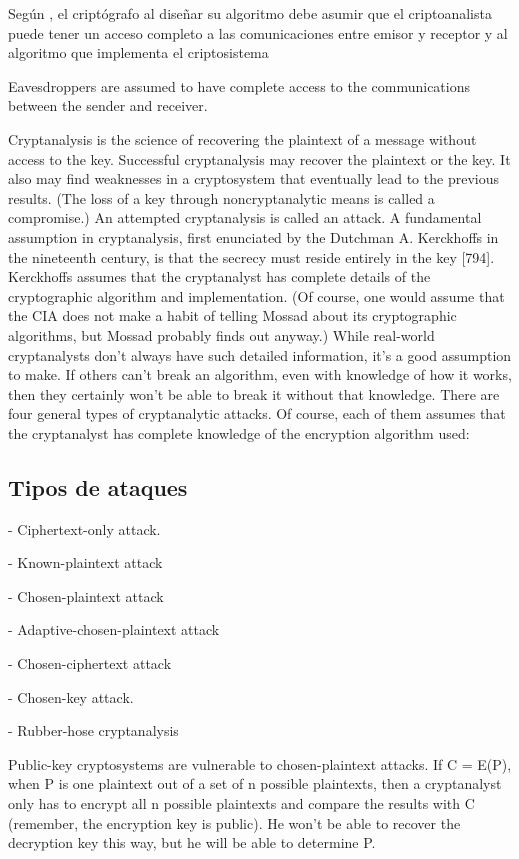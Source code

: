 Según \cite{bruce}, el criptógrafo al diseñar su algoritmo debe asumir que el criptoanalista puede tener un acceso completo a las comunicaciones entre emisor y receptor y al algoritmo que implementa el criptosistema

Eavesdroppers are assumed to have complete access to the communications between the sender and receiver.

Cryptanalysis is the science of recovering the plaintext of a message without access to the key. Successful cryptanalysis may recover the plaintext or the key. It also may find weaknesses in a cryptosystem that eventually lead to the previous results. (The loss of a key through noncryptanalytic means is called a compromise.) An attempted cryptanalysis is called an attack. A fundamental assumption in cryptanalysis, first enunciated by the Dutchman A. Kerckhoffs in the nineteenth century, is that the secrecy must reside entirely in the key [794]. Kerckhoffs assumes that the cryptanalyst has complete details of the cryptographic algorithm and implementation. (Of course, one would assume that the CIA does not make a habit of telling Mossad about its cryptographic algorithms, but Mossad probably finds out anyway.) While real-world cryptanalysts don’t always have such detailed information, it’s a good assumption to make. If others can’t break an algorithm, even with knowledge of how it works, then they certainly won’t be able to break it without that knowledge. There are four general types of cryptanalytic attacks. Of course, each of them assumes that the cryptanalyst has complete knowledge of the encryption algorithm used:

\subsection{Tipos de ataques}

- Ciphertext-only attack.

- Known-plaintext attack
 
- Chosen-plaintext attack
 
- Adaptive-chosen-plaintext attack
 
- Chosen-ciphertext attack
 
- Chosen-key attack.
 
- Rubber-hose cryptanalysis



Public-key cryptosystems are vulnerable to chosen-plaintext attacks. If C = E(P), when P is one plaintext out of a set of n possible plaintexts, then a cryptanalyst only has to encrypt all n possible plaintexts and
compare the results with C (remember, the encryption key is public). He won’t be able to recover the decryption key this way, but he will be able to determine P.


